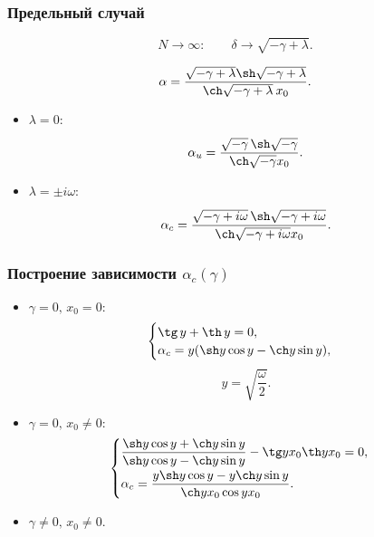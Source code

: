\documentclass[fullscreen=true, unicode, bookmarks=false]{beamer}
\begin{document}
\begin{frame}
\frametitle{ Предельный случай }

$$ N \rightarrow \infty: \qquad \delta \rightarrow \sqrt{-\gamma + \lambda}. $$

\bigskip

\begin{equation}
\alpha = \dfrac{\sqrt{-\gamma+\lambda}\sh\sqrt{-\gamma+\lambda}}{\ch\sqrt{-\gamma+\lambda}\:x_0}.
\end{equation}

\bigskip

\begin{itemize}

\item { $ \lambda = 0: $ 
}

$$ \alpha_u = \frac{ \sqrt{-\gamma} \, \sh \sqrt{-\gamma} }{ \ch \sqrt{-\gamma} x_0 }. $$

\item { $ \lambda = \pm i \omega: $ 
}

$$ \alpha_c = \frac{ \sqrt{-\gamma + i \omega} \, \sh \sqrt{-\gamma + i \omega} }{ \ch \sqrt{-\gamma + i \omega} x_0 }. $$

\end{itemize}	

\end{frame}

\begin{frame}
\frametitle{ Построение зависимости $ \alpha_c(\gamma) $ }
 
\begin{itemize}

\item { $ \gamma = 0, \, x_0 = 0: $ 
\begin{equation}
 \begin{cases}
   \tg \, y + \th \, y = 0, 
   \\
   \alpha_c = y(\sh y \cos y - \ch y \sin y),
 \end{cases}
\end{equation}
$$ y = \sqrt{ \frac{\omega}{2} }. $$
}

\item { $ \gamma = 0, \, x_0 \neq 0: $ 
\begin{equation}
 \begin{cases}
   \dfrac{\sh y \cos y + \ch y \sin y}{\sh y \cos y - \ch y \sin y} - \tg y x_0 \th y x_0 = 0, 
   \vspace{0.1cm}
   \\ 
   \alpha_c = \dfrac{y \sh y \cos y - y \ch y \sin y}{\ch y x_0 \cos y x_0}.
 \end{cases}
\end{equation}
}

\item { $ \gamma \neq 0, \, x_0 \neq 0. $ 
}

\end{itemize}	

\end{frame}
\end{document}
